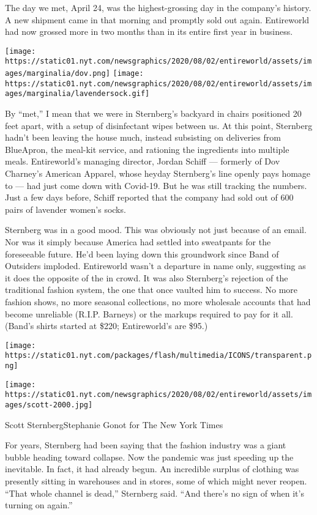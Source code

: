 The day we met, April 24, was the highest-grossing day in the company's
history. A new shipment came in that morning and promptly sold out
again. Entireworld had now grossed more in two months than in its entire
first year in business.

\texttt{[image: https://static01.nyt.com/newsgraphics/2020/08/02/entireworld/assets/images/marginalia/dov.png]}
\texttt{[image: https://static01.nyt.com/newsgraphics/2020/08/02/entireworld/assets/images/marginalia/lavendersock.gif]}

By ``met,'' I mean that we were in Sternberg's backyard in chairs
positioned 20 feet apart, with a setup of disinfectant wipes between us.
At this point, Sternberg hadn't been leaving the house much, instead
subsisting on deliveries from BlueApron, the meal-kit service, and
rationing the ingredients into multiple meals. Entireworld's managing
director, Jordan Schiff --- formerly of Dov Charney's American Apparel,
whose heyday Sternberg's line openly pays homage to --- had just come
down with Covid-19. But he was still tracking the numbers. Just a few
days before, Schiff reported that the company had sold out of 600 pairs
of lavender women's socks.

Sternberg was in a good mood. This was obviously not just because of an
email. Nor was it simply because America had settled into sweatpants for
the foreseeable future. He'd been laying down this groundwork since Band
of Outsiders imploded. Entireworld wasn't a departure in name only,
suggesting as it does the opposite of the in crowd. It was also
Sternberg's rejection of the traditional fashion system, the one that
once vaulted him to success. No more fashion shows, no more seasonal
collections, no more wholesale accounts that had become unreliable
(R.I.P. Barneys) or the markups required to pay for it all. (Band's
shirts started at \$220; Entireworld's are \$95.)

\texttt{[image: https://static01.nyt.com/packages/flash/multimedia/ICONS/transparent.png]}

\texttt{[image: https://static01.nyt.com/newsgraphics/2020/08/02/entireworld/assets/images/scott-2000.jpg]}

Scott SternbergStephanie Gonot for The New York Times

For years, Sternberg had been saying that the fashion industry was a
giant bubble heading toward collapse. Now the pandemic was just speeding
up the inevitable. In fact, it had already begun. An incredible surplus
of clothing was presently sitting in warehouses and in stores, some of
which might never reopen. ``That whole channel is dead,'' Sternberg
said. ``And there's no sign of when it's turning on again.''

